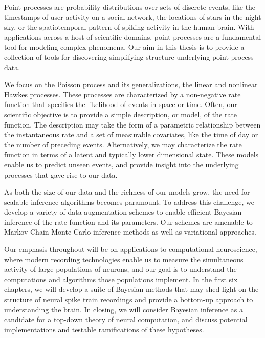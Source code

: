 Point processes are probability distributions over sets of discrete events, 
like the timestamps of user activity on a social network, the locations of 
stars in the night sky, or the spatiotemporal pattern of spiking activity 
in the human brain. With applications across a host of scientific domains, 
point processes are a fundamental tool for modeling complex phenomena. 
Our aim in this thesis is to provide a collection of tools for discovering 
simplifying structure underlying point process data. 

We focus on the Poisson process and its generalizations, the linear and 
nonlinear Hawkes processes. These processes are
characterized by a non-negative rate function that specifies the likelihood 
of events in space or time. Often, our scientific objective is to provide a 
simple description, or model, of the rate function. The description may take the form 
of a parametric relationship between the instantaneous rate and a set of 
measurable covariates, like the time of day or the number of preceding events. 
Alternatively, we may characterize the rate function in terms of a latent and 
typically lower dimensional state.  These models enable us to predict unseen events, 
and provide insight into the underlying processes that gave rise to our data.

As both the size of our data and the richness of our models grow, the need for 
scalable inference algorithms becomes paramount. To address 
this challenge, we develop a variety of data augmentation schemes to 
enable efficient Bayesian inference of the rate function and its parameters.
Our schemes are amenable to Markov Chain Monte Carlo inference methods as 
well as variational approaches. 

Our emphasis throughout will be on applications to computational 
neuroscience, where modern recording technologies enable us to measure the 
simultaneous activity of large populations of neurons, and our goal is to 
understand the computations and algorithms those populations implement. 
In the first six chapters, we will develop a suite of Bayesian methods 
that may shed light on the structure of neural spike train recordings and 
provide a bottom-up approach to understanding the brain.  
In closing, we will consider Bayesian 
inference as a candidate for a top-down theory of neural computation, and 
discuss potential implementations and testable ramifications of these hypotheses.



